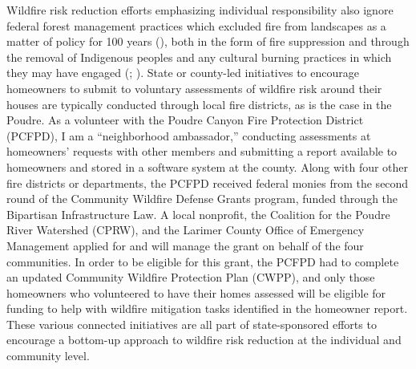 \documentclass[
]{article}
\begin{document}
Wildfire risk reduction efforts emphasizing individual responsibility also ignore federal forest management practices which excluded fire from landscapes as a matter of policy for 100 years (), both in the form of fire suppression and through the removal of Indigenous peoples and any cultural burning practices in which they may have engaged (; ). State or county-led initiatives to encourage homeowners to submit to voluntary assessments of wildfire risk around their houses are typically conducted through local fire districts, as is the case in the Poudre. As a volunteer with the Poudre Canyon Fire Protection District (PCFPD), I am a ``neighborhood ambassador,'' conducting assessments at homeowners' requests with other members and submitting a report available to homeowners and stored in a software system at the county. Along with four other fire districts or departments, the PCFPD received federal monies from the second round of the Community Wildfire Defense Grants program, funded through the Bipartisan Infrastructure Law. A local nonprofit, the Coalition for the Poudre River Watershed (CPRW), and the Larimer County Office of Emergency Management applied for and will manage the grant on behalf of the four communities. In order to be eligible for this grant, the PCFPD had to complete an updated Community Wildfire Protection Plan (CWPP), and only those homeowners who volunteered to have their homes assessed will be eligible for funding to help with wildfire mitigation tasks identified in the homeowner report. These various connected initiatives are all part of state-sponsored efforts to encourage a bottom-up approach to wildfire risk reduction at the individual and community level.
\end{document}

